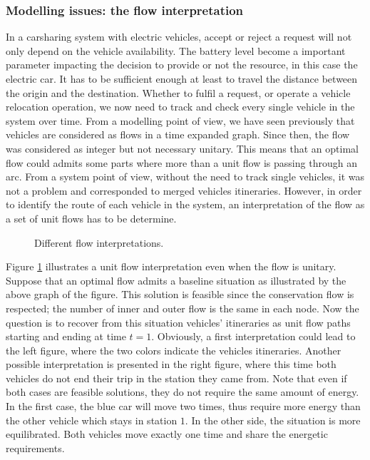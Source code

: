 \begin{bibunit}[ieeetr]
\subsubsection{Modelling issues: the flow interpretation}
In a carsharing system with electric vehicles, accept or reject a request will not only depend on the vehicle availability.
The battery level become a important parameter impacting the decision to provide or not the resource, in this case the electric car.
It has to be sufficient enough at least to travel the distance between the origin and the destination.
Whether to fulfil a request, or operate a vehicle relocation operation, we now need to track and check every single vehicle in the system over time.
From a modelling point of view, we have seen previously that vehicles are considered as flows in a time expanded graph.
Since then, the flow was considered as integer but not necessary unitary.
This means that an optimal flow could admits some parts where more than a unit flow is passing through an arc.
From a system point of view, without the need to track single vehicles, it was not a problem and corresponded to merged vehicles itineraries.
However, in order to identify the route of each vehicle in the system, an interpretation of the flow as a set of unit flows has to be determine.

\begin{figure}[t]
\begin{center}

\end{center}
\caption{Different flow interpretations.}
\label{fig:flowInterpretation}
\end{figure}

\medskip
Figure \ref{fig:flowInterpretation} illustrates a unit flow interpretation even when the flow is unitary.
Suppose that an optimal flow admits a baseline situation as illustrated by the above graph of the figure.
This solution is feasible since the conservation flow is respected; the number of inner and outer flow is the same in each node.
Now the question is to recover from this situation vehicles' itineraries as unit flow paths starting and ending at time $t=1$.
Obviously, a first interpretation could lead to the left figure, where the two colors indicate the vehicles itineraries.
Another possible interpretation is presented in the right figure, where this time both vehicles do not end their trip in the station they came from.
Note that even if both cases are feasible solutions, they do not require the same amount of energy.
In the first case, the blue car will move two times, thus require more energy than the other vehicle which stays in station $1$.
In the other side, the situation is more equilibrated.
Both vehicles move exactly one time and share the energetic requirements.


\end{bibunit}
